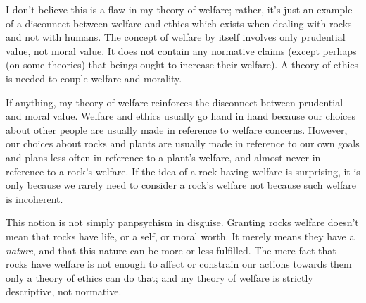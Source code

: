 \documentclass{article}
\begin{document}
I don't believe this is a flaw in my theory of welfare; rather, it's just an example of a disconnect between welfare and ethics which exists when dealing with rocks and not with humans. The concept of welfare by itself involves only prudential value, not moral value. It does not contain any normative claims (except perhaps (on some theories) that beings ought to increase their welfare). A theory of ethics is needed to couple welfare and morality.

If anything, my theory of welfare reinforces the disconnect between prudential and moral value. Welfare and ethics usually go hand in hand because our choices about other people are usually made in reference to welfare concerns. However, our choices about rocks and plants are usually made in reference to our own goals and plans \textemdash{} less often in reference to a plant's welfare, and almost never in reference to a rock's welfare. If the idea of a rock having welfare is surprising, it is only because we rarely need to consider a rock's welfare \textemdash{} not because such welfare is incoherent.

This notion is not simply panpsychism in disguise. Granting rocks welfare doesn't mean that rocks have life, or a self, or moral worth. It merely means they have a \textit{nature}, and that this nature can be more or less fulfilled. The mere fact that rocks have welfare is not enough to affect or constrain our actions towards them \textemdash{} only a theory of ethics can do that; and my theory of welfare is strictly descriptive, not normative. 




\end{document}

